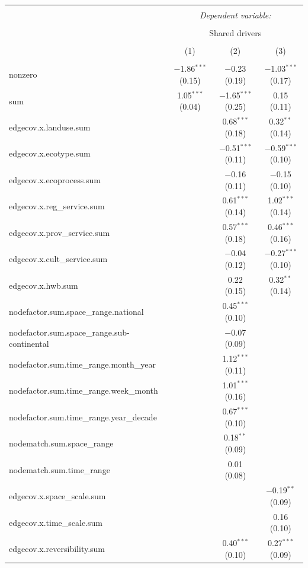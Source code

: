 \documentclass[9pt,]{article}
\begin{document}
\begin{tabular}{@{\extracolsep{5pt}}lccc}
\\[-1.8ex]\hline
\hline \\[-1.8ex]
 & \multicolumn{3}{c}{\textit{Dependent variable:}} \\
\cline{2-4}
\\[-1.8ex] & \multicolumn{3}{c}{Shared drivers} \\
\\[-1.8ex] & (1) & (2) & (3)\\
\hline \\[-1.8ex]
 nonzero & $-$1.86$^{***}$ (0.15) & $-$0.23 (0.19) & $-$1.03$^{***}$ (0.17) \\
  sum & 1.05$^{***}$ (0.04) & $-$1.65$^{***}$ (0.25) & 0.15 (0.11) \\
  edgecov.x.landuse.sum &  & 0.68$^{***}$ (0.18) & 0.32$^{**}$ (0.14) \\
  edgecov.x.ecotype.sum &  & $-$0.51$^{***}$ (0.11) & $-$0.59$^{***}$ (0.10) \\
  edgecov.x.ecoprocess.sum &  & $-$0.16 (0.11) & $-$0.15 (0.10) \\
  edgecov.x.reg\_service.sum &  & 0.61$^{***}$ (0.14) & 1.02$^{***}$ (0.14) \\
  edgecov.x.prov\_service.sum &  & 0.57$^{***}$ (0.18) & 0.46$^{***}$ (0.16) \\
  edgecov.x.cult\_service.sum &  & $-$0.04 (0.12) & $-$0.27$^{***}$ (0.10) \\
  edgecov.x.hwb.sum &  & 0.22 (0.15) & 0.32$^{**}$ (0.14) \\
  nodefactor.sum.space\_range.national &  & 0.45$^{***}$ (0.10) &  \\
  nodefactor.sum.space\_range.sub-continental &  & $-$0.07 (0.09) &  \\
  nodefactor.sum.time\_range.month\_year &  & 1.12$^{***}$ (0.11) &  \\
  nodefactor.sum.time\_range.week\_month &  & 1.01$^{***}$ (0.16) &  \\
  nodefactor.sum.time\_range.year\_decade &  & 0.67$^{***}$ (0.10) &  \\
  nodematch.sum.space\_range &  & 0.18$^{**}$ (0.09) &  \\
  nodematch.sum.time\_range &  & 0.01 (0.08) &  \\
  edgecov.x.space\_scale.sum &  &  & $-$0.19$^{**}$ (0.09) \\
  edgecov.x.time\_scale.sum &  &  & 0.16 (0.10) \\
  edgecov.x.reversibility.sum &  & 0.40$^{***}$ (0.10) & 0.27$^{***}$ (0.09) \\

\end{tabular}
\end{document}
